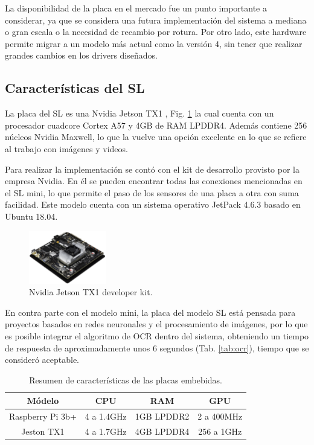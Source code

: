 La disponibilidad de la placa en el mercado fue un punto importante a considerar, ya que se considera una futura implementación del sistema a mediana o gran escala o la necesidad de recambio por rotura. Por otro lado, este hardware permite migrar a un modelo más actual como la versión 4, sin tener que realizar grandes cambios en los drivers diseñados.


\subsection{Características del SL}

La placa del SL es una Nvidia Jetson TX1 \cite{nvidia_manual_nodate}, Fig. \ref{fig:JTX1} la cual cuenta con un procesador cuadcore Cortex A57 y 4GB de RAM LPDDR4. Además contiene  256 núcleos Nvidia Maxwell, lo que la vuelve una opción excelente en lo que se refiere al trabajo con imágenes y videos.

Para realizar la implementación se contó con el kit de desarrollo provisto por la empresa Nvidia. En él se pueden encontrar todas las conexiones mencionadas en el SL mini, lo que permite el paso de los sensores de una placa a otra con suma facilidad.
Este modelo cuenta con un sistema operativo JetPack 4.6.3 basado en Ubuntu 18.04.

\begin{figure}[bth]
    \centering
    \includegraphics[width=0.3\textwidth]{imgs/JTX1-developerkit.png}
    \caption{Nvidia Jetson TX1 developer kit.}
    \label{fig:JTX1}
\end{figure}


En contra parte con el modelo mini, la placa del modelo SL está pensada para proyectos basados en redes neuronales y el procesamiento de imágenes, por lo que es posible integrar el algoritmo de OCR dentro del sistema, obteniendo un tiempo de respuesta de aproximadamente unos 6 segundos (Tab. \ref{tab:ocr}), tiempo que se consideró aceptable.


\begin{table}[bth]
    \centering
    \begin{tabular}{cccc}
        \toprule
        Módelo           & CPU         & RAM        & GPU        \\
        \midrule
        Raspberry Pi 3b+ & 4  a 1.4GHz & 1GB LPDDR2 & 2 a 400MHz \\
        Jeston TX1       & 4  a 1.7GHz & 4GB LPDDR4 & 256 a 1GHz \\
        \bottomrule
    \end{tabular}
    \caption{Resumen de características de las placas embebidas.}
\end{table}

